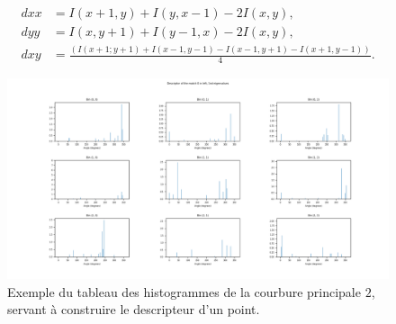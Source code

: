 \documentclass[
	a4paper, %
	10pt, %
	unnumberedsections, %
	twoside, %
]{LTJournalArticle}
\begin{document}
\begin{equation} \label{eq:hess_coefs}
	\begin{split}
		dxx & = I(x+1, y) + I(y, x-1) - 2I(x, y),                                              \\
		dyy & = I(x, y+1) + I(y-1, x) - 2I(x, y),                                              \\
		dxy & = \frac{\left(I(x+1; y+1) + I(x-1, y-1) - I(x-1, y+1) - I(x+1, y-1) \right)}{4}.
	\end{split}
\end{equation}

\begin{figure}[H]
	\centering
	\includegraphics[width=\textwidth]{images/histo_result.png}
	\caption{Exemple du tableau des histogrammes de la courbure principale $2$,
		servant à construire le descripteur d'un point.}
	\label{figure:fig_hist}
\end{figure}

\clearpage
\end{document}
